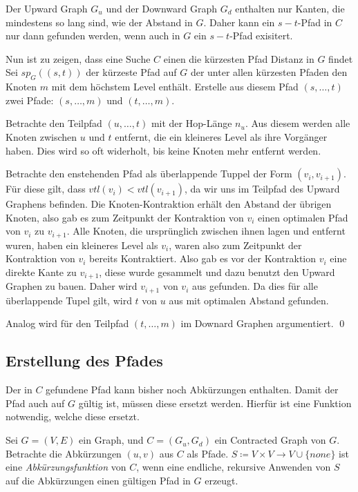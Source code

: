 \begin{beweis}\label{ch:proof:correct}
    Der Upward Graph $G_u$ und der Downward Graph $G_d$ enthalten nur Kanten, die mindestens so lang sind, wie der Abstand in $G$.
    Daher kann ein $s-t$-Pfad in $C$ nur dann gefunden werden, wenn auch in $G$ ein $s-t$-Pfad exisitert.

    Nun ist zu zeigen, dass eine Suche $C$ einen die kürzesten Pfad Distanz in $G$ findet
    Sei ${sp}_G((s, t))$ der kürzeste Pfad auf $G$ der unter allen kürzesten Pfaden den Knoten $m$ mit dem höchstem Level enthält.
    Erstelle aus diesem Pfad $(s, \dotsc, t)$ zwei Pfade: $(s, \dotsc, m)$ und $(t, \dotsc, m)$.

    Betrachte den Teilpfad $(u, \dotsc, t)$ mit der Hop-Länge $n_u$.
    Aus diesem werden alle Knoten zwischen $u$ und $t$ entfernt, die ein kleineres Level als ihre Vorgänger haben.
    Dies wird so oft widerholt, bis keine Knoten mehr entfernt werden.

    Betrachte den enstehenden Pfad als überlappende Tuppel der Form $(v_{i}, v_{i + 1})$.
    Für diese gilt, dass ${vtl}(v_i) < {vtl}(v_{i + 1})$, da wir uns im Teilpfad des Upward Graphens befinden.
    Die Knoten-Kontraktion erhält den Abstand der übrigen Knoten, also gab es zum Zeitpunkt der Kontraktion von $v_i$ einen optimalen Pfad von $v_i$ zu $v_{i + 1}$.
    Alle Knoten, die ursprünglich zwischen ihnen lagen und entfernt wuren, haben ein kleineres Level als $v_i$, waren also zum Zeitpunkt der Kontraktion von $v_i$ bereits Kontraktiert.
    Also gab es vor der Kontraktion $v_i$ eine direkte Kante zu $v_{i + 1}$, diese wurde gesammelt und dazu benutzt den Upward Graphen zu bauen.
    Daher wird $v_{i + 1}$ von $v_i$ aus gefunden.
    Da dies für alle überlappende Tupel gilt, wird $t$ von $u$ aus mit optimalen Abstand gefunden.

    Analog wird für den Teilpfad $(t, \dotsc, m)$ im Downard Graphen argumentiert.
    \qed
\end{beweis}

\subsection{Erstellung des Pfades}\label{ch:subsection:pfad_gewinnung}

Der in $C$ gefundene Pfad kann bisher noch Abkürzungen enthalten.
Damit der Pfad auch auf $G$ gültig ist, müssen diese ersetzt werden.
Hierfür ist eine Funktion notwendig, welche diese ersetzt.

\begin{definition}[Abkürzungsfunktion]
    Sei $G = (V, E)$ ein Graph, und $C = (G_u, G_d)$ ein Contracted Graph von $G$.
    Betrachte die Abkürzungen $(u, v)$ aus $C$ als Pfade.
    $S \coloneq V \times V \to V \cup \{ {none} \}$ ist eine \emph{Abkürzungsfunktion} von $C$, wenn eine endliche, rekursive Anwenden von $S$ auf die Abkürzungen einen gültigen Pfad in $G$ erzeugt.
\end{definition}

